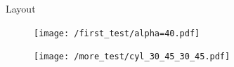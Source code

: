 \documentclass[aspectratio=169,xcolor=dvipsnames]{beamer}
\begin{document}
%
%
\begin{frame}{Layout}
	
\begin{figure}

\begin{minipage}{0.35\textwidth}
	
	\begin{minipage}{0.45\textwidth}
	\tiny{	\def\svgwidth{\linewidth}
		}
	\end{minipage}\hfill
	\begin{minipage}{0.45\textwidth}
		\tiny{	\def\svgwidth{\textwidth}
		}
	\end{minipage}\hfill
	\begin{minipage}{0.45\textwidth}
		\tiny{	\def\svgwidth{\textwidth}
		}
	\end{minipage}\hfill
	\begin{minipage}{0.45\textwidth}
		\tiny{	\def\svgwidth{\textwidth}
		}
	\end{minipage}\hfill
\end{minipage}\hspace{0.07\linewidth}
\begin{minipage}{0.55\textwidth}
	\begin{minipage}{0.45\textwidth}
			\centering
	\end{minipage}\hfill
	\begin{minipage}{0.45\textwidth}
		\texttt{[image: /first\_test/alpha=40.pdf]}
	\end{minipage}\hfill
	\begin{minipage}{0.45\textwidth}
	\end{minipage}\hfill
	\begin{minipage}{0.45\textwidth}
		\texttt{[image: /more\_test/cyl\_30\_45\_30\_45.pdf]}
	\end{minipage}
\end{minipage}\hfill

\end{figure}
\end{frame}
\end{document}

